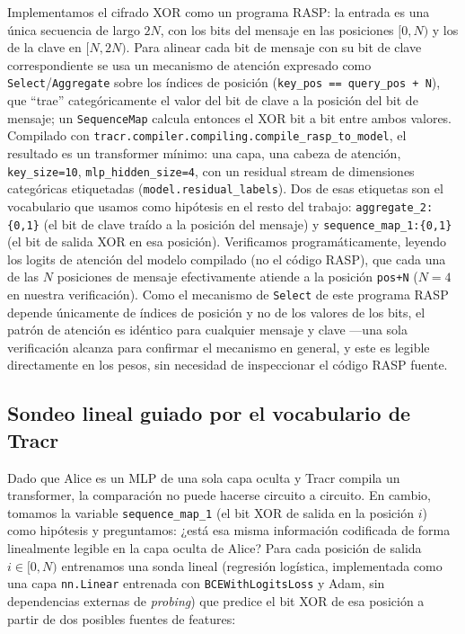 \documentclass[manuscript,screen]{acmart}
\begin{document}
Implementamos el cifrado XOR como un programa RASP: la entrada es una única secuencia de largo
$2N$, con los bits del mensaje en las posiciones $[0, N)$ y los de la clave en $[N, 2N)$. Para
alinear cada bit de mensaje con su bit de clave correspondiente se usa un mecanismo de atención
expresado como \texttt{Select}/\texttt{Aggregate} sobre los índices de posición
(\texttt{key\_pos == query\_pos + N}), que ``trae'' categóricamente el valor del bit de clave a
la posición del bit de mensaje; un \texttt{SequenceMap} calcula entonces el XOR bit a bit entre
ambos valores. Compilado con \texttt{tracr.compiler.compiling.compile\_rasp\_to\_model}, el
resultado es un transformer mínimo: una capa, una cabeza de atención, \texttt{key\_size=10},
\texttt{mlp\_hidden\_size=4}, con un residual stream de dimensiones categóricas etiquetadas
(\texttt{model.residual\_labels}). Dos de esas etiquetas son el vocabulario que usamos como
hipótesis en el resto del trabajo: \texttt{aggregate\_2:\{0,1\}} (el bit de clave traído a la
posición del mensaje) y \texttt{sequence\_map\_1:\{0,1\}} (el bit de salida XOR en esa
posición). Verificamos programáticamente, leyendo los logits de atención del modelo compilado
(no el código RASP), que cada una de las $N$ posiciones de mensaje efectivamente atiende a la
posición \texttt{pos+N} ($N=4$ en nuestra verificación). Como el mecanismo de \texttt{Select} de
este programa RASP depende únicamente de índices de posición y no de los valores de los bits,
el patrón de atención es idéntico para cualquier mensaje y clave —una sola verificación alcanza
para confirmar el mecanismo en general, y este es legible directamente en los pesos, sin
necesidad de inspeccionar el código RASP fuente.

\subsection{Sondeo lineal guiado por el vocabulario de Tracr}
\label{sec:probing}

Dado que Alice es un MLP de una sola capa oculta y Tracr compila un transformer, la comparación
no puede hacerse circuito a circuito. En cambio, tomamos la variable \texttt{sequence\_map\_1}
(el bit XOR de salida en la posición $i$) como hipótesis y preguntamos: ¿está esa misma
información codificada de forma linealmente legible en la capa oculta de Alice? Para cada
posición de salida $i \in [0, N)$ entrenamos una sonda lineal (regresión logística, implementada
como una capa \texttt{nn.Linear} entrenada con \texttt{BCEWithLogitsLoss} y Adam, sin
dependencias externas de \emph{probing}) que predice el bit XOR de esa posición a partir de dos
posibles fuentes de features:
\end{document}
